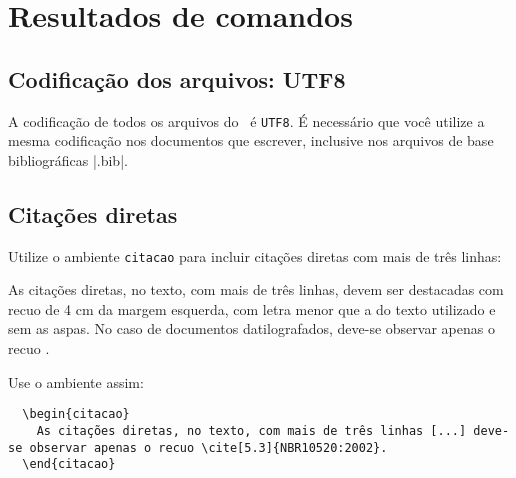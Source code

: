 
\chapter{Resultados de comandos}\label{cap_exemplos}


\section{Codificação dos arquivos: UTF8}

A codificação de todos os arquivos do \abnTeX\ é \texttt{UTF8}. É necessário que você utilize a mesma codificação nos documentos que escrever, inclusive nos arquivos de base bibliográficas |.bib|.

\section{Citações diretas}
\label{sec-citacao}

Utilize o ambiente \texttt{citacao} para incluir citações diretas com mais de três linhas:

\begin{citacao}
  As citações diretas, no texto, com mais de três linhas, devem ser destacadas com recuo de 4 cm da margem esquerda, com letra menor que a do texto utilizado e sem as aspas. No caso de documentos datilografados, deve-se observar apenas o recuo \cite[5.3]{NBR10520:2002}.
\end{citacao}

Use o ambiente assim:

\begin{verbatim}
  \begin{citacao}
    As citações diretas, no texto, com mais de três linhas [...] deve-se observar apenas o recuo \cite[5.3]{NBR10520:2002}.
  \end{citacao}
\end{verbatim}

